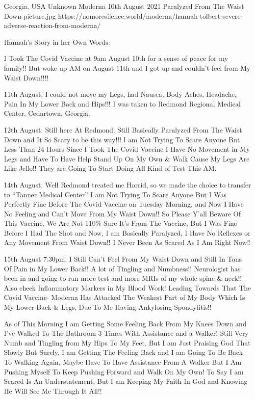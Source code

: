 {Georgia, USA}
{Unknown}
{Moderna}
{10th August 2021}
{Paralyzed From The Waist Down}
{picture.jpg}
{https://nomoresilence.world/moderna/hannah-tolbert-severe-adverse-reaction-from-moderna/}
{

Hannah’s Story in her Own Words:

I Took The Covid Vaccine at 9am August 10th for a sense of peace for my family!!
But woke up AM on August 11th and I got up and couldn’t feel from My Waist
Down!!!!

11th August: I could not move my Legs, had Nausea, Body Aches, Headache, Pain In
My Lower Back and Hips!!! I was taken to Redmond Regional Medical Center,
Cedartown, Georgia.

12th August: Still here At Redmond. Still Basically Paralyzed From The Waist
Down and It So Scary to be this way!!! I am Not Trying To Scare Anyone But Less
Than 24 Hours Since I Took The Covid Vaccine I Have No Movement in My Legs and
Have To Have Help Stand Up On My Own \& Walk Cause My Legs Are Like Jello!! They
are Going To Start Doing All Kind of Test This AM.

14th August: Well Redmond treated me Horrid, so we made the choice to transfer
to “Tanner Medical Center” I am Not Trying To Scare Anyone But I Was Perfectly
Fine Before The Covid Vaccine on Tuesday Morning, and Now I Have No Feeling and
Can’t Move From My Waist Down!! So Please Y’all Beware Of This Vaccine, We Are
Not 110\% Sure It’s From The Vaccine, But I Was Fine Before I Had The Shot and
Now, I am Basically Paralyzed, I Have No Reflexes or Any Movement From Waist
Down!! I Never Been As Scared As I Am Right Now!!

15th August 7:30pm: I Still Can’t Feel From My Waist Down and Still In Tons Of
Pain in My Lower Back!! A lot of Tingling and Numbness!! Neurologist has been in
and going to run more test and more MRIs of my whole spine \& neck!! Also check
Inflammatory Markers in My Blood Work! Leading Towards That The Covid Vaccine-
Moderna Has Attacked The Weakest Part of My Body Which Is My Lower Back \& Legs,
Due To Me Having Ankylosing Spondylitis!!

As of This Morning I am Getting Some Feeling Back From My Knees Down and I’ve
Walked To The Bathroom 3 Times With Assistance and a Walker! Still Very Numb and
Tingling from My Hips To My Feet, But I am Just Praising God That Slowly But
Surely, I am Getting The Feeling Back and I am Going To Be Back To Walking
Again, Maybe Have To Have Assistance From A Walker But I Am Pushing Myself To
Keep Pushing Forward and Walk On My Own! To Say I am Scared Is An
Understatement, But I am Keeping My Faith In God and Knowing He Will See Me
Through It All!!

}
